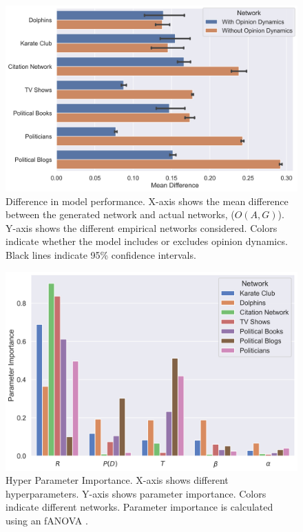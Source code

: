 \documentclass{article}
\begin{document}
\begin{figure}[H]
    \centering
    \includegraphics[width=.8\linewidth]{../plots/overall/Model_Evaluation.png}
  \caption{Difference in model performance. X-axis shows the mean difference between the generated network and actual networks, ($O(A, G)$). Y-axis shows the different empirical networks considered. Colors indicate whether the model includes or excludes opinion dynamics. Black lines indicate 95\% confidence intervals.}
  \label{fig:eval_mean}
\end{figure}

\begin{figure}[H]
    \centering
    \includegraphics[width=.8\linewidth]{../plots/overall/Parameter_Importance.png}
  \caption{Hyper Parameter Importance. X-axis shows different hyperparameters. Y-axis shows parameter importance. Colors indicate different networks. Parameter importance is calculated using an fANOVA \protect\cite{hutter2014efficient}.}
  \label{fig:eval_importance}
\end{figure}
\end{document}
